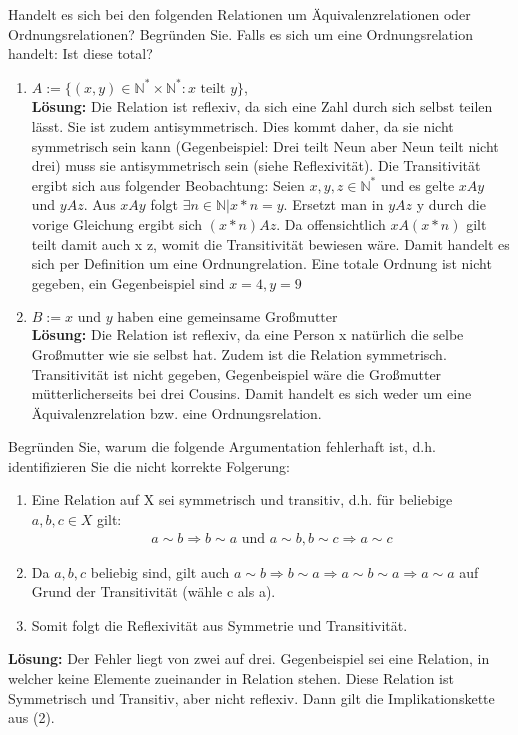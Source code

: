 \documentclass[accentcolor=2d]{tudaexercise}
\begin{document}
\begin{task}{}
Handelt es sich bei den folgenden Relationen um Äquivalenzrelationen oder Ordnungsrelationen? Begründen Sie. Falls es sich um eine Ordnungsrelation handelt: Ist diese total?
\begin{enumerate}[label=(\alph*)]
	\item $A:=\{(x,y)\in \mathbb{N}^* \times \mathbb{N}^*: x \text{ teilt } y\}$,\\
	\textbf{Lösung:} Die Relation ist reflexiv, da sich eine Zahl durch sich selbst teilen lässt. Sie ist zudem antisymmetrisch. Dies kommt daher, da sie nicht symmetrisch sein kann (Gegenbeispiel: Drei teilt Neun aber Neun teilt nicht drei) muss sie antisymmetrisch sein (siehe Reflexivität). Die Transitivität ergibt sich aus folgender Beobachtung: Seien $x,y,z \in \mathbb{N}^*$ und es gelte $xAy$ und $yAz$. Aus $xAy$ folgt $\exists n \in \mathbb{N}| x *n = y$. Ersetzt man in $yAz$  y durch die vorige Gleichung ergibt sich $(x * n)Az$. Da offensichtlich $xA(x*n)$ gilt teilt damit auch x z, womit die Transitivität bewiesen wäre. Damit handelt es sich per Definition um eine Ordnungrelation. Eine totale Ordnung ist nicht gegeben, ein Gegenbeispiel sind $x=4, y=9$
	\item $B:=x \text{ und }y \text{ haben eine gemeinsame Großmutter}$\\
	\textbf{Lösung:} Die Relation ist reflexiv, da eine Person x natürlich die selbe Großmutter wie sie selbst hat. Zudem ist die Relation symmetrisch. Transitivität ist nicht gegeben, Gegenbeispiel wäre die Großmutter mütterlicherseits bei drei Cousins. Damit handelt es sich weder um eine Äquivalenzrelation bzw. eine Ordnungsrelation. 
\end{enumerate}
Begründen Sie, warum die folgende Argumentation fehlerhaft ist, d.h. identifizieren Sie die nicht korrekte Folgerung:
\begin{enumerate}[label=(\arabic*)]
	\item Eine Relation auf X sei symmetrisch und transitiv, d.h. für beliebige $a,b,c \in X$ gilt:
	\begin{gather*}
		a \sim b \Rightarrow b \sim a \text{ und } a\sim b,b \sim c \Rightarrow a \sim c
	\end{gather*}
	\item Da $a,b,c$ beliebig sind, gilt auch $a \sim  b \Rightarrow b \sim a \Rightarrow a\sim b\sim a \Rightarrow a\sim a$ auf Grund der Transitivität (wähle c als a).
	\item Somit folgt die Reflexivität aus Symmetrie und Transitivität.
\end{enumerate}
\textbf{Lösung:}
Der Fehler liegt von zwei auf drei. Gegenbeispiel sei eine Relation, in welcher keine Elemente zueinander in Relation stehen. Diese Relation ist Symmetrisch und Transitiv, aber nicht reflexiv. Dann gilt die Implikationskette aus (2).
\end{task}
\end{document}
